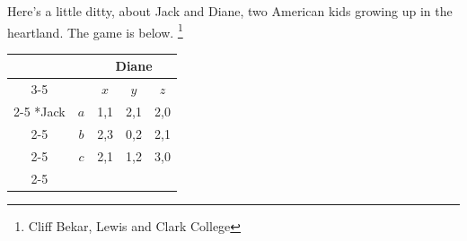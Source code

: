 \documentclass[addpoints ]{exam}
\begin{document}
\begin{questions}
\begin{parts}
\end{parts}
  
\newpage




  








\question%
Here's a little ditty, about Jack and Diane,
two American kids growing up in the heartland.
The game is below.
\footnote{Cliff Bekar, Lewis and Clark College}

  \begin{table}[h!]
    \centering
    \setlength{\extrarowheight}{2pt}
    \begin{tabular}{*{5}{c|}}
      \multicolumn{2}{c}{} & \multicolumn{3}{c}{Diane} \\\cline{3-5}
      \multicolumn{1}{c}{} &     & $x$ & $y$ & $z$ \\\cline{2-5}
      \multirow{3}*{Jack}  & $a$ & 1,1 & 2,1 & 2,0 \\\cline{2-5}
                           & $b$ & 2,3 & 0,2 & 2,1 \\\cline{2-5}
                           & $c$ & 2,1 & 1,2 & 3,0 \\\cline{2-5}
    \end{tabular}
  \end{table}


\end{questions}
\end{document}
